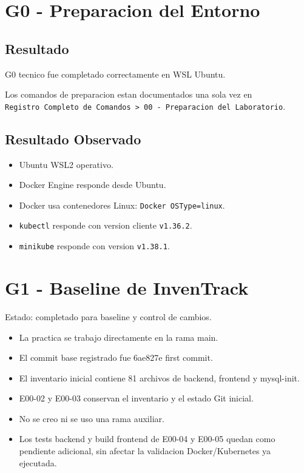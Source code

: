 \section{G0 - Preparacion del Entorno}\label{g0---preparacion-del-entorno}

\subsection{Resultado}\label{resultado}

G0 tecnico fue completado correctamente en WSL Ubuntu.

Los comandos de preparacion estan documentados una sola vez en \texttt{Registro\ Completo\ de\ Comandos\ \textgreater{}\ 00\ -\ Preparacion\ del\ Laboratorio}.

\subsection{Resultado Observado}\label{resultado-observado}

\begin{itemize}
\tightlist
\item
  Ubuntu WSL2 operativo.
\item
  Docker Engine responde desde Ubuntu.
\item
  Docker usa contenedores Linux: \texttt{Docker\ OSType=linux}.
\item
  \texttt{kubectl} responde con version cliente \texttt{v1.36.2}.
\item
  \texttt{minikube} responde con version \texttt{v1.38.1}.
\end{itemize}

\section{G1 - Baseline de InvenTrack}\label{g1---baseline-de-inventrack}

Estado: completado para baseline y control de cambios.

\begin{itemize}
\tightlist
\item
  La practica se trabajo directamente en la rama main.
\item
  El commit base registrado fue 6ae827e first commit.
\item
  El inventario inicial contiene 81 archivos de backend, frontend y mysql-init.
\item
  E00-02 y E00-03 conservan el inventario y el estado Git inicial.
\item
  No se creo ni se uso una rama auxiliar.
\item
  Los tests backend y build frontend de E00-04 y E00-05 quedan como pendiente adicional, sin afectar la validacion Docker/Kubernetes ya ejecutada.
\end{itemize}

